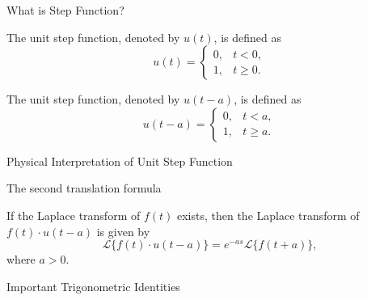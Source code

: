 \documentclass[12pt, a4paper]{article}
\begin{document}
\FrontPage
\Large


\begin{heading}
	What is Step Function?
\end{heading}

\vspace{10pt}

\begin{definition}
	The unit step function, denoted by $u(t)$, is defined as
	\[
		u(t) = \begin{cases}
			0, & t < 0, \\
			1, & t \geq 0.
		\end{cases}
	\]
\end{definition}

\vspace{10pt}

\begin{definition}
	The unit step function, denoted by $u(t-a)$, is defined as
	\[
		u(t-a) = \begin{cases}
			0, & t < a, \\
			1, & t \geq a.
		\end{cases}
	\]
\end{definition}

\clearpage

\begin{heading}
	Physical Interpretation of Unit Step Function
\end{heading}

\clearpage

\begin{heading}
	The second translation formula
\end{heading}

\vspace{10pt}

\begin{theorem}
	If the Laplace transform of $f(t)$ exists, then the Laplace transform of $f(t) \cdot u(t-a)$ is given by
	\[
		\mathcal{L}\{f(t) \cdot u(t-a)\} = e^{-as}\mathcal{L}\{f(t+a)\},
	\]
	where $a > 0$.
\end{theorem}

\clearpage

\begin{heading}
	Important Trigonometric Identities
\end{heading}

\vspace{10pt}
\end{document}
